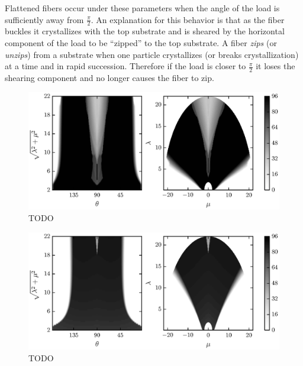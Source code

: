 Flattened fibers occur under these parameters when the angle of the load is sufficiently away from $\frac{\pi}{2}$. An explanation for this behavior is that as the fiber buckles it crystallizes with the top substrate and is sheared by the horizontal component of the load to be ``zipped'' to the top substrate. A fiber \textit{zips} (or \textit{unzips}) from a substrate when one particle crystallizes (or breaks crystallization) at a time and in rapid succession. Therefore if the load is closer to $\frac{\pi}{2}$ it loses the shearing component and no longer causes the fiber to zip.

	\begin{figure}[t]
		\begin{center}
			\includegraphics{./fig/ch3/push/b100/grid.eps}
		\end{center}		
		\caption{ TODO
		\label{fig:PushGrid:b100}}
	\end{figure}	
	
	\begin{figure}[t]
		\begin{center}
			\includegraphics{./fig/ch3/push/b1000/grid.eps}
		\end{center}		
		\caption{ TODO
		\label{fig:PushGrid:b1000}}
	\end{figure}
	
